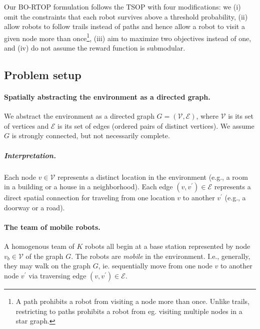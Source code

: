 \documentclass[11pt, oneside]{article}
\begin{document}
Our BO-RTOP formulation follows the TSOP \cite{jorgensen2018team} with four modifications: we (i) omit the constraints that each robot survives above a threshold probability, (ii) allow robots to follow trails instead of paths and hence allow a robot to visit a given node more than once\footnote{A path prohibits a robot from visiting a node more than once. Unlike trails, restricting to paths prohibits a robot from eg. visiting multiple nodes in a star graph.}, (iii) aim to maximize two objectives instead of one, and (iv) do not assume the reward function is submodular. 




\subsection{Problem setup}


\paragraph{Spatially abstracting the environment as a directed graph.}
We abstract the environment as a directed graph $G=(\mathcal{V}, \mathcal{E})$, where $\mathcal{V}$ is its set of vertices and $\mathcal{E}$ is its set of edges (ordered pairs of distinct vertices). We assume $G$ is strongly connected, but not necessarily complete.

\vspace{-\baselineskip}
\subparagraph{Interpretation.} 
Each node $v\in \mathcal{V}$ represents a distinct location in the environment (e.g., a room in a building or a house in a neighborhood).
Each edge $(v, v^\prime) \in \mathcal{E}$ represents a direct spatial connection for traveling from one location $v$ to another $v^\prime$ (e.g., a doorway or a road).



\paragraph{The team of mobile robots.}
A homogenous team of $K$ robots all begin at a base station represented by node $v_b \in \mathcal{V}$ of the graph $G$. The robots are \emph{mobile} in the environment. I.e., generally, they may walk on the graph $G$, ie. sequentially move from one node $v$ to another node $v^\prime$ via traversing edge $(v, v^\prime)\in\mathcal{E}$.
\end{document}
